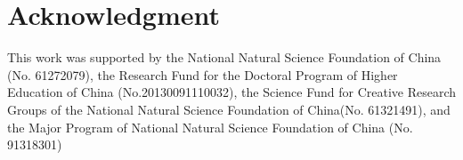 \documentclass[conference]{IEEEtran}
\theoremstyle{definition}
\begin{document}
%







\section*{Acknowledgment}
This work was supported by the National Natural Science Foundation of China (No. 61272079), the Research Fund for the Doctoral Program of Higher Education of China (No.20130091110032), the Science Fund for Creative Research Groups of the National Natural Science Foundation of China(No. 61321491), and the Major Program of National Natural Science Foundation of China (No. 91318301)




\end{document}
